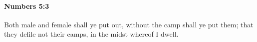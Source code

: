
		\paragraph{Numbers 5:3} %
			\label{NUMBERS-5-3}

			Both male and female shall ye put out, without the camp shall ye put them; that they defile not their camps, in the midst whereof I dwell.


